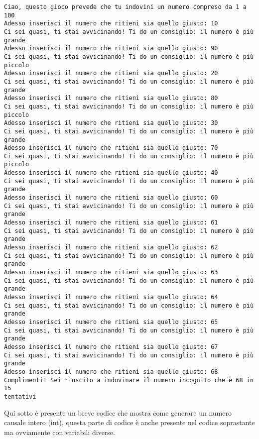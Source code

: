 \documentclass[11pt]{article}
\begin{document}
    \begin{Verbatim}[commandchars=\\\{\}]
Ciao, questo gioco prevede che tu indovini un numero compreso da 1 a 100
Adesso inserisci il numero che ritieni sia quello giusto: 10
Ci sei quasi, ti stai avvicinando! Ti do un consiglio: il numero è più grande
Adesso inserisci il numero che ritieni sia quello giusto: 90
Ci sei quasi, ti stai avvicinando! Ti do un consiglio: il numero è più piccolo
Adesso inserisci il numero che ritieni sia quello giusto: 20
Ci sei quasi, ti stai avvicinando! Ti do un consiglio: il numero è più grande
Adesso inserisci il numero che ritieni sia quello giusto: 80
Ci sei quasi, ti stai avvicinando! Ti do un consiglio: il numero è più piccolo
Adesso inserisci il numero che ritieni sia quello giusto: 30
Ci sei quasi, ti stai avvicinando! Ti do un consiglio: il numero è più grande
Adesso inserisci il numero che ritieni sia quello giusto: 70
Ci sei quasi, ti stai avvicinando! Ti do un consiglio: il numero è più piccolo
Adesso inserisci il numero che ritieni sia quello giusto: 40
Ci sei quasi, ti stai avvicinando! Ti do un consiglio: il numero è più grande
Adesso inserisci il numero che ritieni sia quello giusto: 60
Ci sei quasi, ti stai avvicinando! Ti do un consiglio: il numero è più grande
Adesso inserisci il numero che ritieni sia quello giusto: 61
Ci sei quasi, ti stai avvicinando! Ti do un consiglio: il numero è più grande
Adesso inserisci il numero che ritieni sia quello giusto: 62
Ci sei quasi, ti stai avvicinando! Ti do un consiglio: il numero è più grande
Adesso inserisci il numero che ritieni sia quello giusto: 63
Ci sei quasi, ti stai avvicinando! Ti do un consiglio: il numero è più grande
Adesso inserisci il numero che ritieni sia quello giusto: 64
Ci sei quasi, ti stai avvicinando! Ti do un consiglio: il numero è più grande
Adesso inserisci il numero che ritieni sia quello giusto: 65
Ci sei quasi, ti stai avvicinando! Ti do un consiglio: il numero è più grande
Adesso inserisci il numero che ritieni sia quello giusto: 67
Ci sei quasi, ti stai avvicinando! Ti do un consiglio: il numero è più grande
Adesso inserisci il numero che ritieni sia quello giusto: 68
Complimenti! Sei riuscito a indovinare il numero incognito che è 68 in 15
tentativi
    \end{Verbatim}

    Qui sotto è presente un breve codice che mostra come generare un numero
causale intero (int), questa parte di codice è anche presente nel codice
soprastante ma ovviamente con variabili diverse.
\end{document}
